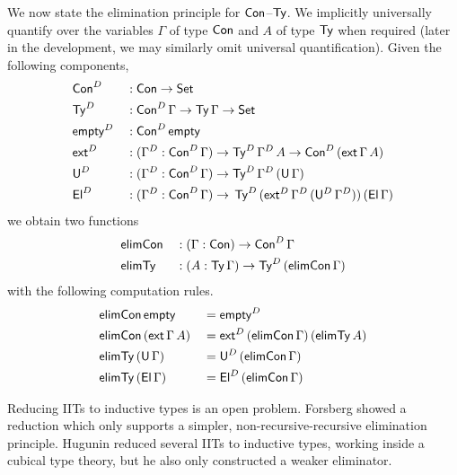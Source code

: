 \documentclass[a4paper,UKenglish,cleveref, autoref]{lipics-v2019}
\begin{document}
We now state  
the elimination principle for $\mathsf{Con}$--$\mathsf{Ty}$.
We implicitly universally quantify over the variables $\Gamma$ of type $\mathsf{Con}$
and $A$ of type $\mathsf{Ty}$ when required (later in the development, we may similarly omit universal quantification).
Given the following components,
\begin{alignat*}{5}
  & \mathsf{Con}^D && : \mathsf{Con}\rightarrow\mathsf{Set} \\
  & \mathsf{Ty}^D && : \mathsf{Con}^D\,\Gamma\rightarrow\mathsf{Ty}\,\Gamma\rightarrow\mathsf{Set} \\
  & \mathsf{empty}^D && : \mathsf{Con}^D\,\mathsf{empty} \\
  & \mathsf{ext}^D && : (\Gamma^D:\mathsf{Con}^D\,\Gamma)\rightarrow \mathsf{Ty}^D\,\Gamma^D\,A\rightarrow \mathsf{Con}^D\,(\mathsf{ext}\,\Gamma\,A) \\
  & \mathsf{U}^D && : (\Gamma^D:\mathsf{Con}^D\,\Gamma)\rightarrow \mathsf{Ty}^D\,\Gamma^D\,(\mathsf{U}\,\Gamma) \\
  & \mathsf{El}^D && : (\Gamma^D:\mathsf{Con}^D\,\Gamma)\rightarrow\,\mathsf{Ty}^D\,(\mathsf{ext}^D\,\Gamma^D\,(\mathsf{U}^D\,\Gamma^D))\,(\mathsf{El}\,\Gamma)
\end{alignat*}
we obtain two functions
\begin{alignat*}{5}
  & \mathsf{elimCon} && : (\Gamma:\mathsf{Con})\rightarrow \mathsf{Con}^D\,\Gamma \\
  & \mathsf{elimTy} && : (A:\mathsf{Ty}\,\Gamma)\rightarrow \mathsf{Ty}^D\,(\mathsf{elimCon}\,\Gamma)
\end{alignat*}
with the following computation rules.
\begin{alignat*}{5}
  & \mathsf{elimCon}\,\mathsf{empty} && = \mathsf{empty}^D \\
  & \mathsf{elimCon}\,(\mathsf{ext}\,\Gamma\,A) && = \mathsf{ext}^D\,(\mathsf{elimCon}\,\Gamma)\,(\mathsf{elimTy}\,A) \\
  & \mathsf{elimTy}\,(\mathsf{U}\,\Gamma) && = \mathsf{U}^D\,(\mathsf{elimCon}\,\Gamma) \\
  & \mathsf{elimTy}\,(\mathsf{El}\,\Gamma) && = \mathsf{El}^D\,(\mathsf{elimCon}\,\Gamma)
\end{alignat*}

Reducing IITs to inductive types is an open problem. Forsberg
\cite{forsberg-phd} showed a reduction which only supports a simpler,
non-recursive-recursive elimination principle. Hugunin \cite{jasper} reduced
several IITs to inductive types, working inside a cubical type theory, but he
also only constructed a weaker eliminator.
\end{document}
